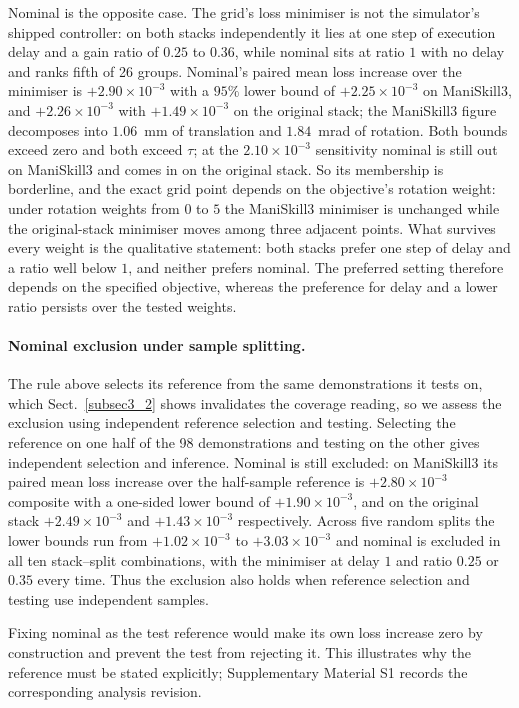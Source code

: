 \documentclass[pdflatex,iicol,sn-apa]{sn-jnl}
\theoremstyle{remark}
\begin{document}
Nominal is the opposite case. The grid's loss minimiser is not the simulator's shipped controller:
on both stacks independently it lies at one step of execution delay and a gain ratio of
$0.25$ to $0.36$, while nominal sits at ratio $1$ with no delay and ranks fifth of 26 groups.
Nominal's paired mean loss increase over the minimiser is $+2.90\times10^{-3}$ with a $95\%$ lower
bound of $+2.25\times10^{-3}$ on ManiSkill3, and $+2.26\times10^{-3}$ with $+1.49\times10^{-3}$ on
the original stack; the ManiSkill3 figure decomposes into $1.06$~mm of translation and $1.84$~mrad
of rotation. Both bounds exceed zero and both exceed $\tau$; at the $2.10\times10^{-3}$ sensitivity
nominal is still out on ManiSkill3 and comes in on the original stack. So its membership is
borderline, and the exact grid point depends on the objective's rotation weight: under
rotation weights from $0$ to $5$ the ManiSkill3 minimiser is unchanged while the
original-stack minimiser moves among three adjacent points. What survives every weight is the
qualitative statement: both stacks prefer one step of delay and a ratio well below $1$, and
neither prefers nominal. The preferred setting therefore depends on the specified objective, whereas the preference
for delay and a lower ratio persists over the tested weights.

\paragraph{Nominal exclusion under sample splitting.}
The rule above selects its reference from the same demonstrations it tests on, which
Sect.~\ref{subsec3_2} shows invalidates the coverage reading, so we assess the exclusion using independent reference selection and testing. Selecting the reference on one half of the
98 demonstrations and testing on the other gives independent selection and inference. Nominal is
still excluded: on ManiSkill3 its paired mean loss increase over the half-sample reference is
$+2.80\times10^{-3}$ composite with a one-sided lower bound of $+1.90\times10^{-3}$, and on the
original stack $+2.49\times10^{-3}$ and $+1.43\times10^{-3}$ respectively. Across five random splits the lower bounds run from
$+1.02\times10^{-3}$ to $+3.03\times10^{-3}$ and nominal is
excluded in all ten stack--split combinations, with the minimiser at delay $1$ and ratio $0.25$ or
$0.35$ every time. Thus the exclusion also holds when reference selection and testing use
independent samples.

Fixing nominal as the test reference would make its own loss increase zero by construction and
prevent the test from rejecting it. This illustrates why the reference must be stated explicitly;
Supplementary Material S1 records the corresponding analysis revision.
\end{document}
